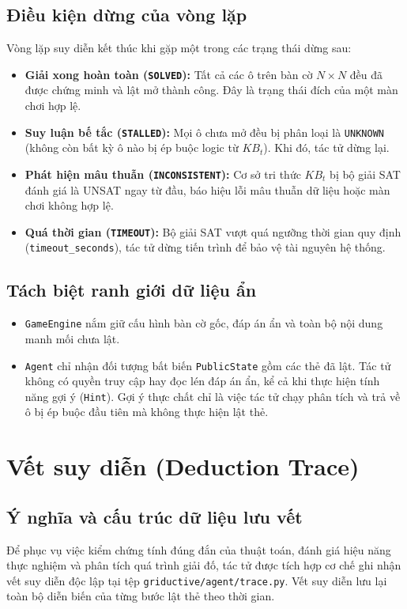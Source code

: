 \subsection{Điều kiện dừng của vòng lặp}
Vòng lặp suy diễn kết thúc khi gặp một trong các trạng thái dừng sau:
\begin{itemize}
    \item \textbf{Giải xong hoàn toàn (\texttt{SOLVED}):} Tất cả các ô trên bàn cờ $N \times N$ đều đã được chứng minh và lật mở thành công. Đây là trạng thái đích của một màn chơi hợp lệ.
    \item \textbf{Suy luận bế tắc (\texttt{STALLED}):} Mọi ô chưa mở đều bị phân loại là \texttt{UNKNOWN} (không còn bất kỳ ô nào bị ép buộc logic từ $KB_t$). Khi đó, tác tử dừng lại.
    \item \textbf{Phát hiện mâu thuẫn (\texttt{INCONSISTENT}):} Cơ sở tri thức $KB_t$ bị bộ giải SAT đánh giá là UNSAT ngay từ đầu, báo hiệu lỗi mâu thuẫn dữ liệu hoặc màn chơi không hợp lệ.
    \item \textbf{Quá thời gian (\texttt{TIMEOUT}):} Bộ giải SAT vượt quá ngưỡng thời gian quy định (\texttt{timeout\_seconds}), tác tử dừng tiến trình để bảo vệ tài nguyên hệ thống.
\end{itemize}

\subsection{Tách biệt ranh giới dữ liệu ẩn}

\begin{itemize}
    \item \texttt{GameEngine} nắm giữ cấu hình bàn cờ gốc, đáp án ẩn và toàn bộ nội dung manh mối chưa lật.
    \item \texttt{Agent} chỉ nhận đối tượng bất biến \texttt{PublicState} gồm các thẻ đã lật. Tác tử không có quyền truy cập hay đọc lén đáp án ẩn, kể cả khi thực hiện tính năng gợi ý (\texttt{Hint}). Gợi ý thực chất chỉ là việc tác tử chạy phân tích và trả về ô bị ép buộc đầu tiên mà không thực hiện lật thẻ.
\end{itemize}


\section{Vết suy diễn (Deduction Trace)}
\label{sec:deduction_trace}

\subsection{Ý nghĩa và cấu trúc dữ liệu lưu vết}
Để phục vụ việc kiểm chứng tính đúng đắn của thuật toán, đánh giá hiệu năng thực nghiệm và phân tích quá trình giải đố, tác tử được tích hợp cơ chế ghi nhận vết suy diễn độc lập tại tệp \texttt{griductive/agent/trace.py}. Vết suy diễn lưu lại toàn bộ diễn biến của từng bước lật thẻ theo thời gian.


